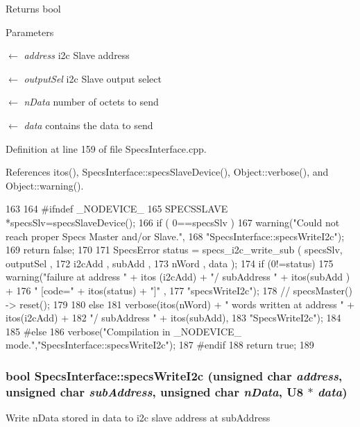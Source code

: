 \begin{DoxyReturn}{Returns}
bool 
\end{DoxyReturn}

\begin{DoxyParams}{Parameters}
\item[\mbox{$\leftarrow$} {\em address}]i2c Slave address \item[\mbox{$\leftarrow$} {\em outputSel}]i2c Slave output select \item[\mbox{$\leftarrow$} {\em nData}]number of octets to send \item[\mbox{$\leftarrow$} {\em data}]contains the data to send \end{DoxyParams}


Definition at line 159 of file SpecsInterface.cpp.

References itos(), SpecsInterface::specsSlaveDevice(), Object::verbose(), and Object::warning().


\begin{DoxyCode}
163                                             {
164 #ifndef _NODEVICE_
165   SPECSSLAVE *specsSlv=specsSlaveDevice();
166   if ( 0==specsSlv ){
167     warning("Could not reach proper Specs Master and/or Slave.",
168             "SpecsInterface::specsWriteI2c");
169     return false;
170   }
171   SpecsError status = specs_i2c_write_sub ( specsSlv, outputSel , 
172                                             i2cAdd , subAdd , 
173                                             nWord , data );
174   if (0!=status){
175     warning("failure at address " + itos (i2cAdd) + "/ subAddress " + itos(subAdd
      ) +
176             " [code=" + itos(status) + "]" ,
177             "specsWriteI2c");
178     //    specsMaster() -> reset();
179   }
180   else {
181     verbose(itos(nWord) + " words written at address " + itos(i2cAdd) + 
182             "/ subAddress " + itos(subAdd),
183             "SpecsWriteI2c");
184   }
185 #else
186   verbose("Compilation in _NODEVICE_ mode.","SpecsInterface::specsWriteI2c");
187 #endif
188   return true;
189 }
\end{DoxyCode}
\hypertarget{classSpecsInterface_a08dff9a17cd6073cd94fbd2cf7340dbd}{
\subsubsection[{specsWriteI2c}]{\setlength{\rightskip}{0pt plus 5cm}bool SpecsInterface::specsWriteI2c (unsigned char {\em address}, \/  unsigned char {\em subAddress}, \/  unsigned char {\em nData}, \/  {\bf U8} $\ast$ {\em data})}}
\label{classSpecsInterface_a08dff9a17cd6073cd94fbd2cf7340dbd}
Write nData stored in data to i2c slave address at subAddress

